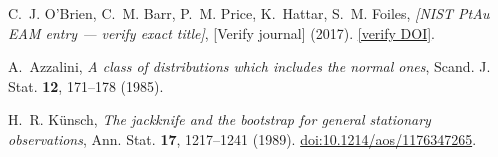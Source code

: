 
C.~J. O'Brien, C.~M. Barr, P.~M. Price, K.~Hattar, S.~M. Foiles,
\emph{[NIST PtAu EAM entry — verify exact title]},
[Verify journal] (2017).
\href{[verify DOI]}{[verify DOI]}.

A.~Azzalini,
\emph{A class of distributions which includes the normal ones},
Scand. J. Stat. \textbf{12}, 171--178 (1985).

H.~R. K\"unsch,
\emph{The jackknife and the bootstrap for general stationary observations},
Ann. Stat. \textbf{17}, 1217--1241 (1989).
\href{https://doi.org/10.1214/aos/1176347265}{doi:10.1214/aos/1176347265}.
